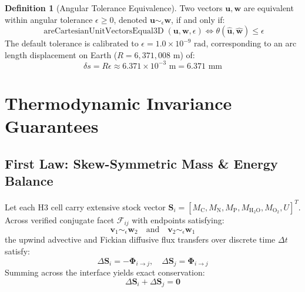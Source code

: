 \documentclass[10pt,twocolumn,letterpaper]{article}
\theoremstyle{definition}
\newtheorem{definition}{Definition}
\begin{document}
\begin{definition}[Angular Tolerance Equivalence]
Two vectors $\mathbf{u}, \mathbf{w}$ are equivalent within angular tolerance $\epsilon \ge 0$, denoted $\mathbf{u} \sim_\epsilon \mathbf{w}$, if and only if:
\begin{equation}
\operatorname{areCartesianUnitVectorsEqual3D}(\mathbf{u}, \mathbf{w}, \epsilon) \iff \theta(\hat{\mathbf{u}}, \hat{\mathbf{w}}) \le \epsilon
\end{equation}
The default tolerance is calibrated to $\epsilon = 1.0 \times 10^{-9}\text{ rad}$, corresponding to an arc length displacement on Earth ($R = 6,371,008\text{ m}$) of:
\begin{equation}
\delta s = R \epsilon \approx 6.371 \times 10^{-3}\text{ m} = 6.371\text{ mm}
\end{equation}
\end{definition}

\section{Thermodynamic Invariance Guarantees}

\subsection{First Law: Skew-Symmetric Mass \& Energy Balance}
Let each H3 cell carry extensive stock vector $\mathbf{S}_i = [M_{\text{C}}, M_{\text{N}}, M_{\text{P}}, M_{\text{H}_2\text{O}}, M_{\text{O}_2}, U]^T$. Across verified conjugate facet $\mathcal{F}_{ij}$ with endpoints satisfying:
\begin{equation}
\mathbf{v}_1 \sim_\epsilon \mathbf{w}_2 \quad \text{and} \quad \mathbf{v}_2 \sim_\epsilon \mathbf{w}_1
\end{equation}
the upwind advective and Fickian diffusive flux transfers over discrete time $\Delta t$ satisfy:
\begin{equation}
\Delta \mathbf{S}_i = -\boldsymbol{\Phi}_{i \to j}, \quad \Delta \mathbf{S}_j = \boldsymbol{\Phi}_{i \to j}
\end{equation}
Summing across the interface yields exact conservation:
\begin{equation}
\Delta \mathbf{S}_i + \Delta \mathbf{S}_j = \mathbf{0}
\end{equation}
\end{document}
